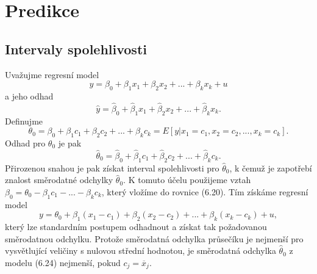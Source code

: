 \section{Predikce}

\subsection{Intervaly spolehlivosti}

Uvažujme regresní model
\begin{equation}
y = \beta_0 + \beta_1 x_1 + \beta_2 x_2 + ... + \beta_k x_k + u
\end{equation}
a jeho odhad
\begin{equation}
\hat{y} = \hat{\beta}_0 + \hat{\beta}_1 x_1 + \hat{\beta}_2 x_2 + ... + \hat{\beta}_k x_k.
\end{equation}
Definujme
\begin{equation}
\theta_0 = \beta_0 + \beta_1 c_1 + \beta_2 c_2 + ... + \beta_k c_k = E[y | x_1 = c_1, x_2 = c_2, ..., x_k = c_k].
\end{equation}
Odhad pro $\theta_0$ je pak
\begin{equation}
\hat{\theta}_0 = \hat{\beta}_0 + \hat{\beta}_1 c_1 + \hat{\beta}_2 c_2 + ... + \hat{\beta}_k c_k.
\end{equation}
Přirozenou snahou je pak získat interval spolehlivosti pro $\hat{\theta}_0$, k čemuž je zapotřebí znalost směrodatné odchylky 
$\hat{\theta}_0$. K tomuto účelu použijeme vztah $\beta_0 = \theta_0 - \beta_1 c_1 - ... - \beta_k c_k$, který vložíme do rovnice (6.20). Tím 
získáme regresní model
\begin{equation}
y = \theta_0 + \beta_1 (x_1 - c_1) + \beta_2 (x_2 - c_2) + ... + \beta_k(x_k - c_k) + u,
\end{equation}
který lze standardním postupem odhadnout a získat tak požadovanou směrodatnou odchylku. Protože směrodatná odchylka průsečíku je nejmenší pro vysvětlující veličiny s nulovou střední hodnotou, je směrodatná odchylka 
$\hat{\theta}_0$ z modelu (6.24) nejmenší, pokud $c_j = \overline{x}_j$.

